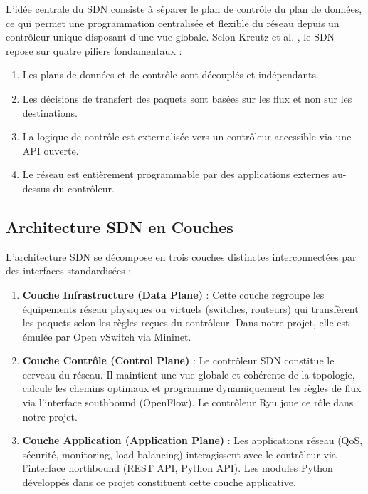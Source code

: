 \documentclass[12pt,a4paper]{report}
\begin{document}
L'idée centrale du SDN consiste à séparer le plan de
contrôle du plan de données, ce qui permet une
programmation centralisée et flexible du réseau depuis
un contrôleur unique disposant d'une vue globale.
Selon Kreutz et al. \cite{kreutz2015software}, le SDN
repose sur quatre piliers fondamentaux :
\begin{enumerate}
    \item Les plans de données et de contrôle sont
    découplés et indépendants.
    \item Les décisions de transfert des paquets sont
    basées sur les flux et non sur les destinations.
    \item La logique de contrôle est externalisée vers
    un contrôleur accessible via une API ouverte.
    \item Le réseau est entièrement programmable par des
    applications externes au-dessus du contrôleur.
\end{enumerate}

\subsection{Architecture SDN en Couches}
L'architecture SDN se décompose en trois couches distinctes
interconnectées par des interfaces standardisées :

\begin{enumerate}
    \item \textbf{Couche Infrastructure (Data Plane)} :
    Cette couche regroupe les équipements réseau physiques
    ou virtuels (switches, routeurs) qui transfèrent les
    paquets selon les règles reçues du contrôleur. Dans
    notre projet, elle est émulée par Open vSwitch via
    Mininet.
    \item \textbf{Couche Contrôle (Control Plane)} :
    Le contrôleur SDN constitue le cerveau du réseau.
    Il maintient une vue globale et cohérente de la
    topologie, calcule les chemins optimaux et programme
    dynamiquement les règles de flux via l'interface
    southbound (OpenFlow). Le contrôleur Ryu joue ce
    rôle dans notre projet.
    \item \textbf{Couche Application (Application Plane)} :
    Les applications réseau (QoS, sécurité, monitoring,
    load balancing) interagissent avec le contrôleur via
    l'interface northbound (REST API, Python API). Les
    modules Python développés dans ce projet constituent
    cette couche applicative.
\end{enumerate}
\end{document}
